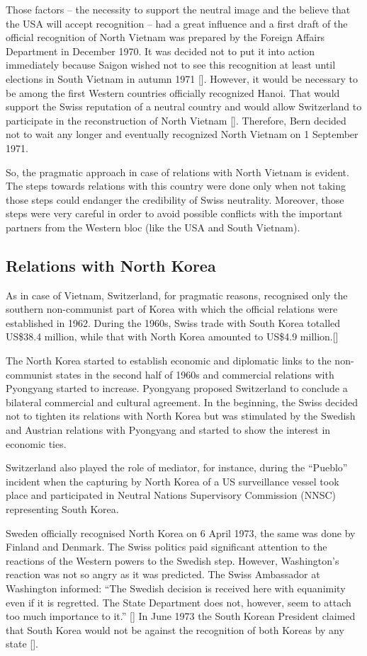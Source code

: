 \documentclass[a4paper]{article}
\begin{document}
Those factors – the necessity to support the neutral image and the believe that the USA will accept recognition – had a great influence and a first draft of the official recognition of North Vietnam was prepared by the Foreign Affairs Department in December 1970. It was decided not to put it into action immediately because Saigon wished not to see this recognition at least until elections in South Vietnam in autumn 1971 []. However, it would be necessary to be among the first Western countries officially recognized Hanoi. That would support the Swiss reputation of a neutral country and would allow Switzerland to participate in the  reconstruction of North Vietnam []. Therefore, Bern decided not to wait any longer and eventually recognized North Vietnam on 1 September 1971.

So, the pragmatic approach in case of relations with North Vietnam is evident. The steps towards relations with this country were done only when not taking those steps could endanger the credibility of Swiss neutrality. Moreover, those steps were very careful in order to avoid possible conflicts with the important partners from the Western bloc (like the USA and South Vietnam).
\subsection{Relations with North Korea}
As in case of Vietnam, Switzerland, for pragmatic reasons, recognised only the southern non-communist part of Korea with which the official relations were established in 1962. During the 1960s, Swiss trade with South Korea totalled US\$38.4 million, while that with North Korea amounted to US\$4.9 million.[]

The North Korea started to establish economic and diplomatic links to the non-communist states in the second half of 1960s and commercial relations with Pyongyang started to increase. Pyongyang proposed Switzerland to conclude a bilateral commercial and cultural agreement. In the beginning, the Swiss decided not to tighten its relations with North Korea but was stimulated by the Swedish and Austrian relations with Pyongyang and started to show the interest in economic ties.

Switzerland also played the role of mediator, for instance, during the “Pueblo” incident when the capturing by North Korea of a US surveillance vessel took place and participated in Neutral Nations Supervisory Commission (NNSC) representing South Korea.

Sweden officially recognised North Korea on 6 April 1973, the same was done by Finland and Denmark. The Swiss politics paid significant attention to the reactions of the Western powers to the Swedish step. However, Washington’s reaction was not so angry as it was predicted. The Swiss Ambassador at Washington informed: “The Swedish decision is received here with equanimity even if it is regretted. The State Department does not, however, seem to attach too much importance to it.” [] In June 1973 the South Korean President claimed that South Korea would not be against the recognition of both Koreas by any state [].
\end{document}
